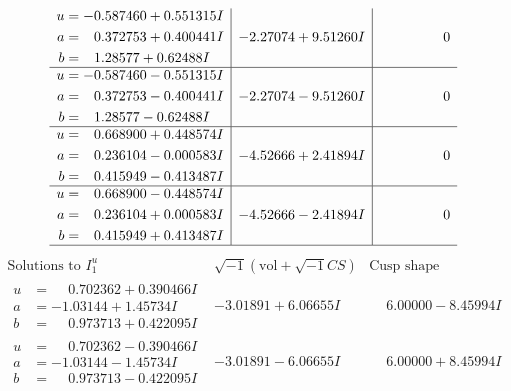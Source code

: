 \documentclass[1p]{elsarticle_modified}
\theoremstyle{definition}
\newcommand{\I}{\sqrt{-1}}
\begin{document}
$$\begin{array}{c|c|c}
\begin{aligned}
u &= -0.587460 + 0.551315 I \\
a &= \phantom{-}0.372753 + 0.400441 I \\
b &= \phantom{-}1.28577 + 0.62488 I\end{aligned}
 & -2.27074 + 9.51260 I & \phantom{-0.000000 } 0 \\ \hline\begin{aligned}
u &= -0.587460 - 0.551315 I \\
a &= \phantom{-}0.372753 - 0.400441 I \\
b &= \phantom{-}1.28577 - 0.62488 I\end{aligned}
 & -2.27074 - 9.51260 I & \phantom{-0.000000 } 0 \\ \hline\begin{aligned}
u &= \phantom{-}0.668900 + 0.448574 I \\
a &= \phantom{-}0.236104 - 0.000583 I \\
b &= \phantom{-}0.415949 - 0.413487 I\end{aligned}
 & -4.52666 + 2.41894 I & \phantom{-0.000000 } 0 \\ \hline\begin{aligned}
u &= \phantom{-}0.668900 - 0.448574 I \\
a &= \phantom{-}0.236104 + 0.000583 I \\
b &= \phantom{-}0.415949 + 0.413487 I\end{aligned}
 & -4.52666 - 2.41894 I & \phantom{-0.000000 } 0\\
 \hline 
 \end{array}$$\newpage$$\begin{array}{c|c|c}  
\text{Solutions to }I^u_{1}& \I (\text{vol} + \sqrt{-1}CS) & \text{Cusp shape}\\
 \hline 
\begin{aligned}
u &= \phantom{-}0.702362 + 0.390466 I \\
a &= -1.03144 + 1.45734 I \\
b &= \phantom{-}0.973713 + 0.422095 I\end{aligned}
 & -3.01891 + 6.06655 I & \phantom{-}6.00000 - 8.45994 I \\ \hline\begin{aligned}
u &= \phantom{-}0.702362 - 0.390466 I \\
a &= -1.03144 - 1.45734 I \\
b &= \phantom{-}0.973713 - 0.422095 I\end{aligned}
 & -3.01891 - 6.06655 I & \phantom{-}6.00000 + 8.45994 I \\ \hline\begin{aligned}

\end{aligned}
\end{array}$$
\end{document}

